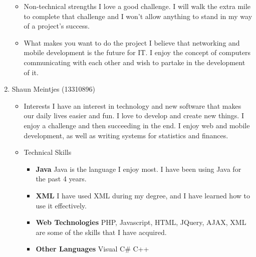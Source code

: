 \documentclass[12pt, oneside]{article}
\begin{document}
\begin{enumerate}
\begin{itemize}
			\item Non-technical strengths\newline\newline
				I love a good challenge. I will walk the extra mile to complete that challenge and I won't allow anything
				to stand in my way of a project's success.\newline
			\item What makes you want to do the project\newline\newline
				I believe that networking and mobile development is the future for IT. I enjoy the concept of computers communicating with each other and wish to partake in the development of it.\newline
		\end{itemize}
		\item {Shaun Meintjes (13310896)\par}
		\begin{itemize}
				\texttt{[image: Shaun]} %
			\item Interests\newline\newline
				I have an interest in technology and new software that makes our daily lives easier and fun. I love to 						develop and create new things. I enjoy a challenge and then succeeding in the end. I enjoy web and 						mobile development, as well as writing systems for statistics and finances.\newline
			\item Technical Skills\newline
				\begin{itemize}
				\item {\bf Java}\newline
					Java is the language I enjoy most. I have been using Java for the past 4 years.
				\item {\bf XML}\newline
					I have used XML during my degree, and I have learned how to use it effectively.
				\item {\bf Web Technologies}\newline
					PHP, Javascript, HTML, JQuery, AJAX, XML are some of the skills that I have acquired.
				\item {\bf Other Languages}\newline
					Visual C\#\newline
					C++\newline

\end{itemize}
\end{itemize}
\end{enumerate}
\end{document}
